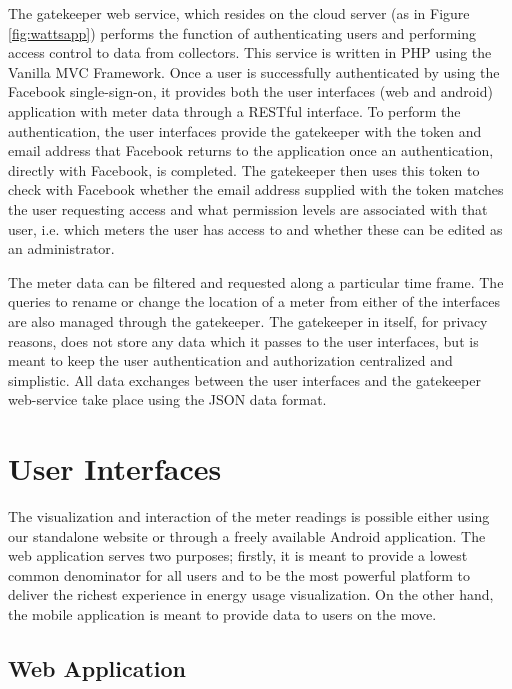\documentclass[10pt, conference, compsocconf]{IEEEtran}
\begin{document}
The gatekeeper web service, which resides on the cloud server (as
in Figure \ref{fig:wattsapp}) performs the function of authenticating
users and performing access control to data from collectors. This
service is written in PHP using the Vanilla MVC Framework. Once a
user is successfully authenticated by using the Facebook single-sign-on,
it provides both the user interfaces (web and android) application
with meter data through a RESTful interface. To perform the authentication,
the user interfaces provide the gatekeeper with the token and email
address that Facebook returns to the application once an authentication,
directly with Facebook, is completed. The gatekeeper then uses this
token to check with Facebook whether the email address supplied with
the token matches the user requesting access and what permission levels
are associated with that user, i.e. which meters the user has access
to and whether these can be edited as an administrator.

The meter data can be filtered and requested along a particular time
frame. The queries to rename or change the location of a meter from
either of the interfaces are also managed through the gatekeeper.
The gatekeeper in itself, for privacy reasons, does not store any
data which it passes to the user interfaces, but is meant to keep
the user authentication and authorization centralized and simplistic.
All data exchanges between the user interfaces and the gatekeeper
web-service take place using the JSON data format.

\section{User Interfaces}

The visualization and interaction of the meter readings is possible
either using our standalone website or through a freely available
Android application. The web application serves two purposes; firstly,
it is meant to provide a lowest common denominator for all users and
to be the most powerful platform to deliver the richest experience
in energy usage visualization. On the other hand, the mobile application
is meant to provide data to users on the move.


\subsection{Web Application}
\end{document}
